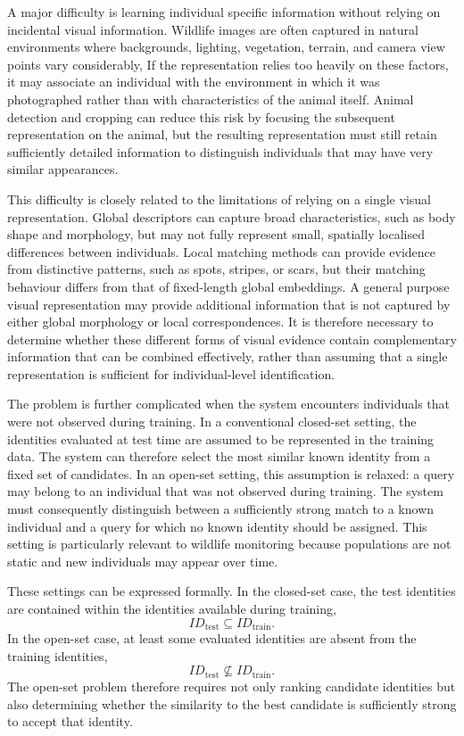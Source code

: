 \documentclass[runningheads]{llncs}
\begin{document}
A major difficulty is learning individual specific information without
relying on incidental visual information. Wildlife images are often captured
in natural environments where backgrounds, lighting, vegetation, terrain, and
camera view points vary considerably, If the representation relies too heavily
on these factors, it may associate an individual with the environment in
which it was photographed rather than with characteristics of the animal
itself. Animal detection and cropping can reduce this risk by focusing the
subsequent representation on the animal, but the resulting representation
must still retain sufficiently detailed information to distinguish individuals
that may have very similar appearances.

This difficulty is closely related to the limitations of relying on a single
visual representation. Global descriptors can capture broad characteristics,
such as body shape and morphology, but may not fully represent small,
spatially localised differences between individuals. Local matching methods
can provide evidence from distinctive patterns, such as spots, stripes, or
scars, but their matching behaviour differs from that of fixed-length global
embeddings. A general purpose visual representation may provide additional
information that is not captured by either global morphology or local
correspondences. It is therefore necessary to determine whether these
different forms of visual evidence contain complementary information that can
be combined effectively, rather than assuming that a single representation is
sufficient for individual-level identification.

The problem is further complicated when the system encounters individuals
that were not observed during training. In a conventional closed-set setting,
the identities evaluated at test time are assumed to be represented in the
training data. The system can therefore select the most similar known
identity from a fixed set of candidates. In an open-set setting, this
assumption is relaxed: a query may belong to an individual that was not
observed during training. The system must consequently distinguish between a
sufficiently strong match to a known individual and a query for which no
known identity should be assigned. This setting is particularly relevant to
wildlife monitoring because populations are not static and new individuals
may appear over time.

These settings can be expressed formally. In the closed-set case, the test
identities are contained within the identities available during training,
\[
ID_{\mathrm{test}} \subseteq ID_{\mathrm{train}}.
\]
In the open-set case, at least some evaluated identities are absent from the
training identities,
\[
ID_{\mathrm{test}} \not\subseteq ID_{\mathrm{train}}.
\]
The open-set problem therefore requires not only ranking candidate identities
but also determining whether the similarity to the best candidate is
sufficiently strong to accept that identity.
\end{document}
